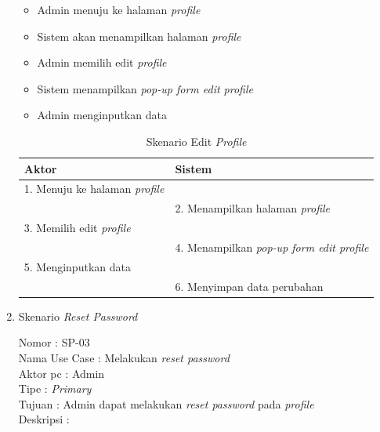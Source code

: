 \begin{enumerate}
\begin{itemize}
	\item Admin menuju ke halaman \textit{profile}
	\item Sistem akan menampilkan halaman \textit{profile}
	\item Admin memilih edit \textit{profile}
	\item Sistem menampilkan \textit{pop-up form edit profile}
	\item Admin menginputkan data
	
\end{itemize}

\begin{table}
	\caption{Skenario Edit \textit{Profile}}
	\centering
	\begin{tabular}{ |  p{59mm} | l |}
		\hline 
		\textbf{Aktor} & \textbf{Sistem} \\
		\hline
		
		1.	Menuju ke halaman \textit{profile} &  \\
		
		\hline
		
		&  2.	Menampilkan halaman \textit{profile} \\
		
		\hline
		
		 3. Memilih edit \textit{profile} & \\
		
		\hline
		
			& 4.	Menampilkan\textit{ pop-up form edit profile} \\
		
		\hline
		
		5.	Menginputkan data  & \\
		\hline
		
		& 6.	Menyimpan data perubahan\\
		\hline
		
	\end{tabular}
\end{table}

\item Skenario \textit{Reset Password}

Nomor \kern 3.6pc : SP-03 \\
Nama Use Case : Melakukan \textit{reset password} \\
Aktor  pc : Admin \\
Tipe \kern 4.6pc : \textit{Primary} \\
Tujuan \kern 3.6pc : Admin dapat melakukan \textit{reset password} pada \textit{profile} \\
Deskripsi \kern 2.5pc : 


\end{enumerate}
